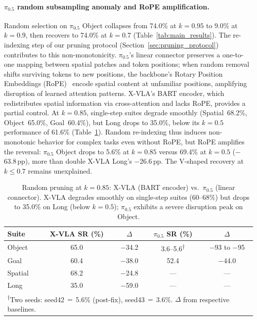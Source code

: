 \paragraph{$\pi_{0.5}$ random subsampling anomaly and RoPE amplification.}
Random selection on $\pi_{0.5}$ Object collapses from 74.0\% at $k{=}0.95$ to 9.0\% at $k{=}0.9$, then recovers to 74.0\% at $k{=}0.7$ (Table~\ref{tab:main_results}). The re-indexing step of our pruning protocol (Section~\ref{sec:pruning_protocol}) contributes to this non-monotonicity. $\pi_{0.5}$'s linear connector preserves a one-to-one mapping between spatial patches and token positions; when random removal shifts surviving tokens to new positions, the backbone's Rotary Position Embeddings (RoPE)~\cite{su2024roformer} encode spatial content at unfamiliar positions, amplifying disruption of learned attention patterns. X-VLA's BART encoder, which redistributes spatial information via cross-attention and lacks RoPE, provides a partial control. At $k{=}0.85$, single-step suites degrade smoothly (Spatial~68.2\%, Object~65.0\%, Goal~60.4\%), but Long drops to 35.0\%, below its $k{=}0.5$ performance of 61.6\% (Table~\ref{tab:xvla_k085_crosssuite}). Random re-indexing thus induces non-monotonic behavior for complex tasks even without RoPE, but RoPE amplifies the reversal: $\pi_{0.5}$ Object drops to 5.6\% at $k{=}0.85$ versus 69.4\% at $k{=}0.5$ ($-$63.8\,pp), more than double X-VLA Long's $-$26.6\,pp. The V-shaped recovery at $k \leq 0.7$ remains unexplained.

\begin{table}[ht]
\centering
\small
\caption{Random pruning at $k{=}0.85$: X-VLA (BART encoder) vs.\ $\pi_{0.5}$ (linear connector). X-VLA degrades smoothly on single-step suites (60--68\%) but drops to 35.0\% on Long (below $k{=}0.5$); $\pi_{0.5}$ exhibits a severe disruption peak on Object.}
\label{tab:xvla_k085_crosssuite}
\begin{tabular}{lcccc}
\toprule
Suite & X-VLA SR (\%) & $\Delta$ & $\pi_{0.5}$ SR (\%) & $\Delta$ \\
\midrule
Object & 65.0 & $-$34.2 & 3.6--5.6\textsuperscript{$\dagger$} & $-$93 to $-$95 \\
Goal & 60.4 & $-$38.0 & 52.4 & $-$44.0 \\
Spatial & 68.2 & $-$24.8 & --- & --- \\
Long & 35.0 & $-$59.0 & --- & --- \\
\bottomrule
\multicolumn{5}{l}{\footnotesize\textsuperscript{$\dagger$}Two seeds: seed42$\,{=}\,$5.6\% (post-fix), seed43$\,{=}\,$3.6\%. $\Delta$ from respective baselines.}
\end{tabular}
\end{table}

